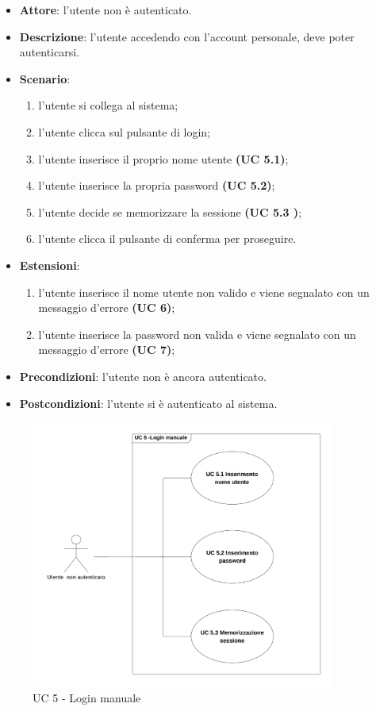 \begin{itemize}
    \item \textbf{Attore}: l'utente non è autenticato.
    \item \textbf{Descrizione}: l'utente accedendo con l'account personale, deve poter autenticarsi.
    \item \textbf{Scenario}:
    \begin{enumerate}
        \item l'utente si collega al sistema;
        \item l'utente clicca sul pulsante di login;
        \item l'utente inserisce il proprio nome utente \textbf{(UC 5.1)};
        \item l'utente inserisce la propria password \textbf{(UC 5.2)};
        \item l'utente decide se memorizzare la sessione \textbf{(UC 5.3 )};
        \item l'utente clicca il pulsante di conferma per proseguire.
    \end{enumerate}
    \item \textbf{Estensioni}:
        \begin{enumerate}
            \item l'utente inserisce il nome utente non valido e viene segnalato con un messaggio d'errore \textbf{(UC 6)};
            \item l'utente inserisce la password non valida e viene segnalato con un messaggio d'errore \textbf{(UC 7)};
        \end{enumerate}

    \item \textbf{Precondizioni}: l'utente non è ancora autenticato.
    \item \textbf{Postcondizioni}: l'utente si è autenticato al sistema.
\end{itemize}

\begin{figure}[!h]
    \includegraphics[width=10cm]{sezioni/Images/UC5_s.png}
    \centering
    \caption{UC 5 - Login manuale}
\end{figure}

